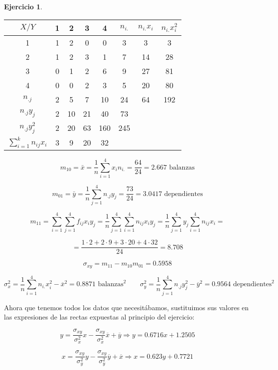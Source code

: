\documentclass[a4paper, 12pt]{article}
\theoremstyle{definition}
\newtheorem{ej}{Ejercicio}
\begin{document}
\begin{ej}
\begin{enumerate}[label=\alph*)]
\begin{center}
\begin{tabular}{c|cccc|ccc}
	\(X/Y\) & 1 & 2 & 3 & 4 & \(n_{i.}\) & \(n_{i.}x_i\) & \(n_{i.}x_i^2\) \\
	\hline
	1 & 1 & 2 & 0 & 0 & 3 & 3 & 3\\
	2 & 1 & 2 & 3 & 1 & 7 & 14 & 28\\
	3 & 0 & 1 & 2 & 6 & 9 & 27 & 81\\
	4 & 0 & 0 & 2 & 3 & 5 & 20 & 80\\
	\hline
	\(n_{.j}\) & 2 & 5 & 7 & 10 & 24 & 64 & 192 \\
	\(n_{.j} y_j\) & 2 & 10 & 21 & 40 & 73 \\
	\(n_{.j} y_j^2\) & 2 & 20 & 63 & 160 & 245 \\
	\(\sum_{i=1}^{k}n_{ij}x_i\) & 3 & 9 & 20 & 32 \\
\end{tabular}
\end{center}

\[
	m_{10} = \bar{x} = \frac{1}{n} \sum_{i=1}^{4} x_i n_{i.} = \frac{64}{24} = 2.667 \text{ balanzas}
\]

\[
    m_{01} = \bar{y} = \frac{1}{n} \sum_{j=1}^{4} n_{.j} y_j = \frac{73}{24} = 3.0417 \text{ dependientes}
\]

\[
	m_{11} = \sum_{i=1}^{4}\sum_{j=1}^{4}f_{ij}x_i y_j = \frac{1}{n}\sum_{j=1}^{4}\sum_{i=1}^{4}n_{ij}x_i y_j = \frac{1}{n}\sum_{j=1}^{4}y_j\sum_{i=1}^{4}n_{ij}x_i =
\]

\[
    = \frac{1 \cdot 2 + 2 \cdot 9 + 3 \cdot 20+4 \cdot 32}{24} = 8.708
\]

\[
    \sigma_{xy} = m_{11} -m_{10} m_{01} = 0.5958
\]

\[
    \sigma_{x}^{2} = \frac{1}{n} \sum_{i=1}^{4} n_{i.} x_i^2 - \overline{x}^2 = 0.8871  \text{ balanzas}^{2} \qquad \sigma_{y}^{2} = \frac{1}{n} \sum_{j=1}^{4} n_{.j} y_j^2 - \overline{y}^2 = 0.9564  \text{ dependientes}^{2}
\]

Ahora que tenemos todos los datos que necesitábamos, sustituimos sus valores en las expresiones de las rectas expuestas al principio del ejercicio:

\[
    y = \frac{\sigma_{xy}}{\sigma_x^2}x - \frac{\sigma_{xy}}{\sigma_x^2} \overline{x} + \overline{y} \Rightarrow y = 0.6716x+1.2505
\]

\[
    x = \frac{\sigma_{xy}}{\sigma_y^2}y - \frac{\sigma_{xy}}{\sigma_y^2} \overline{y} + \overline{x} \Rightarrow x = 0.623y+0.7721
\]

\newpage


\end{enumerate}
\end{ej}
\end{document}
